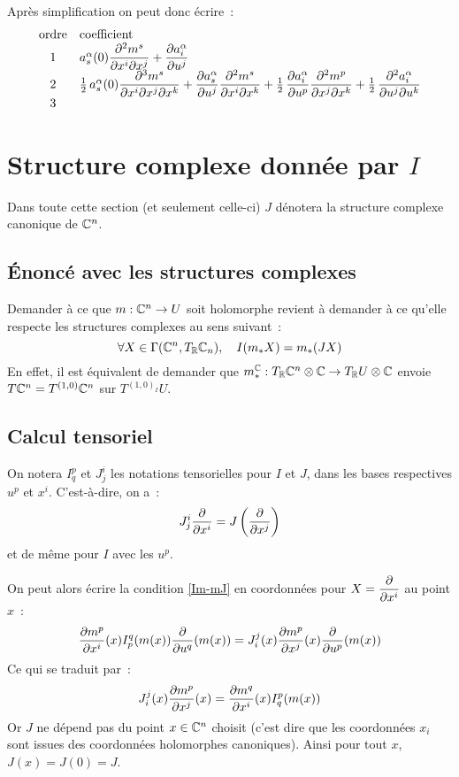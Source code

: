 \documentclass[a4paper,draft]{amsart}
\begin{document}
Après simplification on peut donc écrire~:
\[
\begin{array}{cl}
\text{ordre} & \text{coefficient} \\  
1 & a_s^\alpha(0)\dfrac{\partial^2{m^s}}{\partial{x^i}\partial{x^j}} + \dfrac{\partial{a_i^\alpha}}{\partial{u^j}} \\ 
2 & \operatorname{\frac{1}{2}} a_s^\alpha(0)\dfrac{\partial^3{m^s}}{\partial{x^i}\partial{x^j}\partial{x^k}} + \dfrac{\partial{a_s^\alpha}}{\partial{u^j}}\dfrac{\partial^2{m^s}}{\partial{x^i}\partial{x^k}} +  \operatorname{\frac{1}{2}} \dfrac{\partial{a_i^\alpha}}{\partial{u^p}}\dfrac{\partial^2{m^p}}{\partial{x^j}\partial{x^k}} + \operatorname{\frac{1}{2}} \dfrac{\partial^2{a_i^\alpha}}{\partial{u^j}\partial{u^k}}\\ 
3 & \\
\end{array} 
\]

\section{Structure complexe donnée par $I$}
Dans toute cette section (et seulement celle-ci) $J$ dénotera la structure complexe canonique de $\mathbb{C}^n$.
\subsection{Énoncé avec les structures complexes}
Demander à ce que $m : \mathbb{C}^n \rightarrow U$ soit holomorphe revient à demander à ce qu'elle respecte les structures complexes au sens suivant~:
\begin{equation}
\forall X \in \Gamma(\mathbb{C}^n,T_{\mathbb{R}}\mathbb{C}_n),\quad I(m_* X) = m_*(J X)
\label{Im-mJ}
\end{equation}
En effet, il est équivalent de demander que $m_*^{\mathbb{C}} : T_{\mathbb{R}}\mathbb{C}^n \otimes \mathbb{C} \rightarrow T_{\mathbb{R}} U \otimes \mathbb{C}$ envoie $T\mathbb{C}^n = T^{(1,0)}\mathbb{C}^n$ sur $T^{(1,0)_I}U$.

\subsection{Calcul tensoriel}
On notera $I^p_q$ et $J_j^i$ les notations tensorielles pour $I$ et $J$, dans les bases respectives $u^p$ et $x^i$. C'est-à-dire, on a~:
\[
J^i_j \dfrac{\partial{}}{\partial{x^i}} = J\left(\dfrac{\partial{}}{\partial{x^j}}\right)
\]
et de même pour $I$ avec les $u^p$.

On peut alors écrire la condition \eqref{Im-mJ} en coordonnées pour $X = \dfrac{\partial{}}{\partial{x^i}}$ au point $x$~:
\[
\dfrac{\partial{m^p}}{\partial{x^i}}(x)I^q_p(m(x))\dfrac{\partial{}}{\partial{u^q}}(m(x))
= J_i^j(x) \dfrac{\partial{m^p}}{\partial{x^j}}(x)\dfrac{\partial{}}{\partial{u^p}}(m(x))
\]
Ce qui se traduit par~:
\begin{equation*}
J^j_i(x) \dfrac{\partial{m^p}}{\partial{x^j}}(x) = \dfrac{\partial{m^q}}{\partial{x^i}}(x)I^p_q(m(x))
\end{equation*}
Or $J$ ne dépend pas du point $x\in\mathbb{C}^n$ choisit (c'est dire que les coordonnées $x_i$ sont issues des coordonnées holomorphes canoniques). Ainsi pour tout $x$, $J(x) = J(0) = J$.
\end{document}
